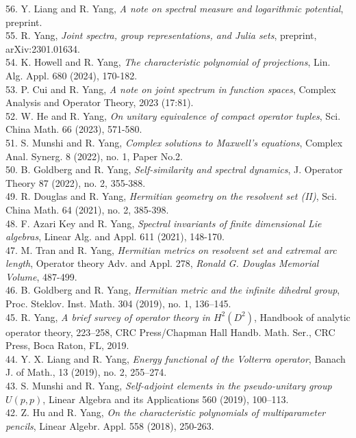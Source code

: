 \documentclass[12pt]{res} %
\begin{document}
\begin{resume}
56. Y. Liang and R. Yang, {\em A note on spectral measure and logarithmic potential}, preprint.\\
55. R. Yang, {\em Joint spectra, group representations, and Julia sets}, preprint, arXiv:2301.01634.\\
54. K. Howell and R. Yang, {\em The characteristic polynomial of projections}, Lin. Alg. Appl. 680 (2024), 170-182.\\
53. P. Cui and R. Yang, {\em A note on joint spectrum in function spaces}, Complex Analysis and Operator Theory, 2023 (17:81).\\
52. W. He and R. Yang, {\em On unitary equivalence of compact operator tuples}, Sci. China Math. 66 (2023), 571-580.\\
51. S. Munshi and R. Yang, {\em Complex solutions to Maxwell's equations}, Complex Anal. Synerg. 8 (2022), no. 1, Paper No.2.\\
50. B. Goldberg and R. Yang, {\em Self-similarity and spectral dynamics}, J. Operator Theory 87 (2022), no. 2, 355-388.\\
49. R. Douglas and R. Yang, {\em Hermitian geometry on the resolvent set (II)}, Sci. China Math. 64 (2021), no. 2, 385-398.\\
48. F. Azari Key and R. Yang, {\em Spectral invariants of finite dimensional Lie algebras}, Linear Alg. and Appl. 611 (2021), 148-170.\\
47. M. Tran and R. Yang, {\em Hermitian metrics on resolvent set and extremal arc length}, Operator theory Adv. and Appl. 278, {\em Ronald G. Douglas Memorial Volume}, 487-499.\\
46. B. Goldberg and R. Yang, {\em Hermitian metric and the infinite dihedral group}, Proc. Steklov. Inst. Math. 304 (2019), no. 1, 136–145.\\
45. R. Yang, {\em A brief survey of operator theory in $H^2(D^2)$}, Handbook of analytic operator theory, 223–258, CRC Press/Chapman Hall Handb. Math. Ser., CRC Press, Boca Raton, FL, 2019.\\
44. Y. X. Liang and {R. Yang}, \textit{Energy functional of the Volterra operator}, Banach J. of Math., 13 (2019), no. 2, 255–274.\\
43. S. Munshi and R. Yang, \textit{Self-adjoint elements in the pseudo-unitary group $U(p,p)$}, Linear Algebra and its Applications 560 (2019), 100–113.\\
42. Z. Hu and {R. Yang}, {\em On the characteristic polynomials of multiparameter pencils}, Linear Algebr. Appl. 558 (2018), 250-263.\\

\end{resume}
\end{document}
